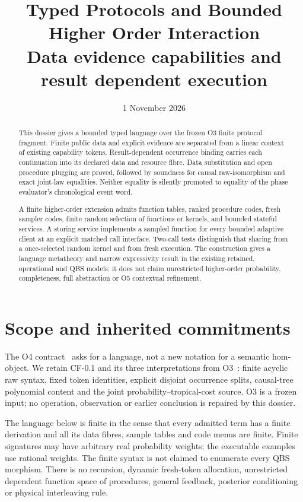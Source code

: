 \documentclass[11pt,a4paper]{article}
\title{Typed Protocols and Bounded Higher Order Interaction\\[5pt]
\large Data evidence capabilities and result dependent execution}
\date{1 November 2026}
\theoremstyle{definition}
\begin{document}
\maketitle

\begin{abstract}
This dossier gives a bounded typed language over the frozen O3 finite
protocol fragment. Finite public data and explicit evidence are separated
from a linear context of existing capability tokens. Result-dependent
occurrence binding carries each continuation into its declared data and
resource fibre. Data substitution and open procedure plugging are proved,
followed by soundness for causal raw-isomorphism and exact joint-law
equalities. Neither equality is silently promoted to equality of the
phase evaluator's chronological event word.

A finite higher-order extension admits function tables, ranked procedure
codes, fresh sampler codes, finite random selection of functions or kernels,
and bounded stateful services. A storing service implements a sampled
function for every bounded adaptive client at an explicit matched call
interface. Two-call tests distinguish that sharing from a once-selected
random kernel and from fresh execution. The construction gives a language
metatheory and narrow expressivity result in the existing retained,
operational and QBS models; it does not claim unrestricted higher-order
probability, completeness, full abstraction or O5 contextual refinement.
\end{abstract}

\tableofcontents

\section{Scope and inherited commitments}\label{sec:scope}
The O4 contract~\cite{Contract} asks for a language, not a new notation for
a semantic hom-object. We retain CF-0.1 and its three interpretations from
O3~\cite{O3}: finite acyclic raw syntax, fixed token identities, explicit
disjoint occurrence splits, causal-tree polynomial content and the joint
probability--tropical-cost source. O3 is a frozen input; no operation,
observation or earlier conclusion is repaired by this dossier.

The language below is finite in the sense that every admitted term has a
finite derivation and all its data fibres, sample tables and code menus
are finite. Finite signatures may have arbitrary real probability weights;
the executable examples use rational weights. The finite syntax is not
claimed to enumerate every QBS morphism. There is no recursion, dynamic
fresh-token allocation, unrestricted dependent function space of
procedures, general feedback, posterior conditioning or physical
interleaving rule.
\end{document}
